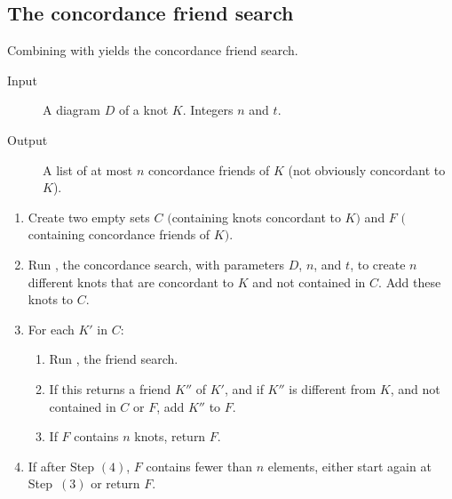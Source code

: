 \documentclass{amsart} %
\theoremstyle{thm}
\theoremstyle{definition}
\numberwithin{equation}{section}
\begin{document}
\subsection{The concordance friend search}

Combining  with  yields the concordance friend search.

\begin{algorithm}
\caption{Concordance friend search}
\label{algo:concordance_friend_search}
\begin{description}
    \item[Input] A diagram $D$ of a knot $K$. Integers $n$ and $t$.
    \item[Output] A list of at most $n$ concordance friends of $K$ (not obviously concordant to $K$).
\end{description}
    \begin{enumerate}
        \item Create two empty sets $C$ $($containing knots concordant to $K$$)$ and $F$ $($containing concordance friends of $K$$)$.
        \item Run , the concordance search, with parameters $D$, $n$, and $t$, to create $n$ different knots that are concordant to $K$ and not contained in $C$. Add these knots to $C$.
        \item For each $K'$ in $C$:
        \begin{enumerate}
            \item Run , the friend search.
            \item If this returns a friend $K''$ of $K'$, and if $K''$ is different from $K$, and not contained in $C$ or $F$, add $K''$ to $F$.
            \item If $F$ contains $n$ knots, return $F$.
        \end{enumerate}
        \item If after Step $(4)$, $F$ contains fewer than $n$ elements, either start again at Step~$(3)$ or return $F$.
    \end{enumerate}
\end{algorithm}
\end{document}
